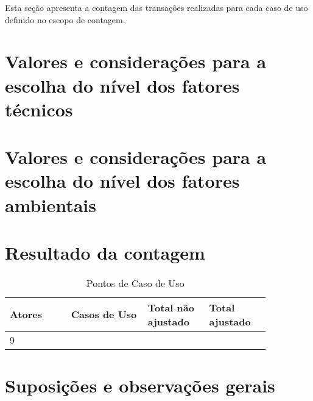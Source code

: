   Esta seção apresenta a contagem das transações realizadas para cada caso de uso definido no escopo de contagem.

  

\section{Valores e considerações para a escolha do nível dos fatores técnicos}

\section{Valores e considerações para a escolha do nível dos fatores ambientais}

\vfill
\pagebreak
\section{Resultado da contagem}

\begin{table*}[!h]
\centering
\caption{Pontos de Caso de Uso}
\label{Rotulo}
  \begin{tabular}{|p{0.20\linewidth}|p{0.25\linewidth}|p{0.20\linewidth}|p{0.20\linewidth}|}
  \hline
  \textbf{Atores} & \textbf{Casos de Uso} & \textbf{Total não ajustado} & \textbf{Total ajustado} \\ 
  \hline

  9 & & &\\
  \hline
  \end{tabular}
\end{table*}

\section{Suposições e observações gerais}

